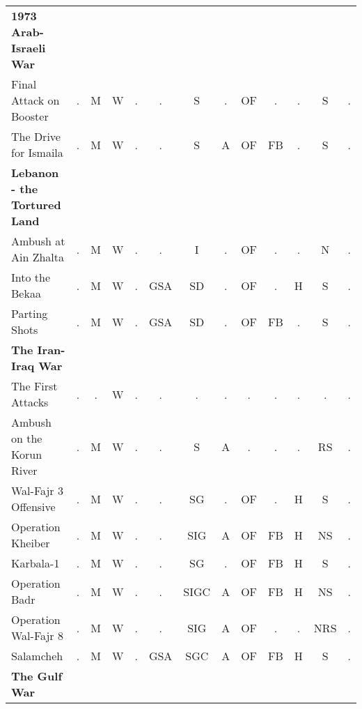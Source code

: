 \documentclass[a4paper]{article}
\newenvironment{texte}{\rmfamily\footnotesize}{}
\begin{document}
\begin{texte}
\begin{tabular}{lcccccccccccc}
\bf 1973 Arab-Israeli War \\

     Final Attack on Booster                       & . &  M &  W &  . &  .  & S  & . & OF &  . & . &  S & . \\
     The Drive for Ismaila                         & . &  M &  W &  . &  .  & S  & A & OF & FB & . &  S & . \\

\bf Lebanon - the Tortured Land \\

     Ambush at Ain Zhalta                          & . &  M &  W &  . &  .  & I  & . & OF &  . & . &  N & . \\
     Into the Bekaa                                & . &  M &  W &  . & GSA & SD & . & OF &  . & H &  S & . \\
     Parting Shots                                 & . &  M &  W &  . & GSA & SD & . & OF & FB & . &  S & . \\

\bf The Iran-Iraq War \\

     The First Attacks                             & . &  . &  W &  . &  .  &  .    & . &  . &  . & . &  .  & . \\
     Ambush on the Korun River                     & . &  M &  W &  . &  .  & S     & A &  . &  . & . & RS  & . \\
     Wal-Fajr 3 Offensive                          & . &  M &  W &  . &  .  & SG    & . & OF &  . & H &  S  & . \\
     Operation Kheiber                             & . &  M &  W &  . &  .  & SIG   & A & OF & FB & H & NS  & . \\
     Karbala-1                                     & . &  M &  W &  . &  .  & SG    & . & OF & FB & H &  S  & . \\
     Operation Badr                                & . &  M &  W &  . &  .  & SIGC  & A & OF & FB & H & NS  & . \\
     Operation Wal-Fajr 8                          & . &  M &  W &  . &  .  & SIG   & A & OF &  . & . & NRS & . \\
     Salamcheh                                     & . &  M &  W &  . & GSA & SGC   & A & OF & FB & H &  S  & . \\

\bf The Gulf War \\


\end{tabular}
\end{texte}
\end{document}
